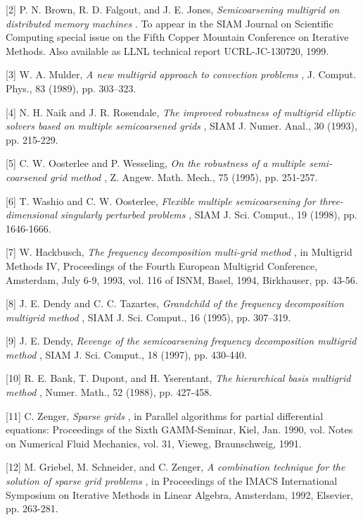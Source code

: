 \documentclass[11pt]{article}
\begin{document}
[2] P. N. Brown, R. D. Falgout, and J. E. Jones,
{\em 
Semicoarsening
multigrid on distributed memory machines
}
.  To appear in the SIAM
Journal on Scientific Computing special issue on the Fifth Copper
Mountain Conference on Iterative Methods. Also available as LLNL
technical report UCRL-JC-130720, 1999.

[3] W. A. Mulder,
{\em 
A new multigrid approach to convection
problems
}
, J.  Comput. Phys., 83 (1989), pp. 303--323.

[4] N. H. Naik and J. R. Rosendale,
{\em 
The improved robustness of
multigrid elliptic solvers based on multiple semicoarsened grids
}
,
SIAM J. Numer.  Anal., 30 (1993), pp. 215-229.

[5] C. W. Oosterlee and P. Wesseling,
{\em 
On the robustness of a multiple
semi-coarsened grid method
}
, Z. Angew. Math. Mech., 75 (1995),
pp. 251-257.

[6] T. Washio and C. W. Oosterlee,
{\em 
Flexible multiple semicoarsening for
three-dimensional singularly perturbed problems
}
, SIAM
J. Sci. Comput., 19 (1998), pp. 1646-1666.

[7] W. Hackbusch,
{\em 
The frequency decomposition multi-grid method
}
,
in Multigrid Methods IV, Proceedings of the Fourth European Multigrid
Conference, Amsterdam, July 6-9, 1993, vol. 116 of ISNM, Basel, 1994,
Birkhauser, pp. 43-56.

[8] J. E. Dendy and C. C. Tazartes,
{\em 
Grandchild of the frequency
decomposition multigrid method
}
, SIAM J. Sci. Comput., 16 (1995),
pp. 307--319.

[9] J. E. Dendy,
{\em 
Revenge of the semicoarsening frequency
decomposition multigrid method
}
, SIAM J. Sci. Comput., 18 (1997),
pp. 430-440.

[10] R. E. Bank, T. Dupont, and H. Yserentant,
{\em 
The hierarchical basis
multigrid method
}
, Numer. Math., 52 (1988), pp. 427-458.

[11] C. Zenger,
{\em 
Sparse grids
}
, in Parallel algorithms for partial
differential equations: Proceedings of the Sixth GAMM-Seminar, Kiel,
Jan.  1990, vol. Notes on Numerical Fluid Mechanics, vol. 31, Vieweg,
Braunschweig, 1991.

[12] M. Griebel, M. Schneider, and C. Zenger,
{\em 
A combination technique
for the solution of sparse grid problems
}
, in Proceedings of the
IMACS International Symposium on Iterative Methods in Linear Algebra,
Amsterdam, 1992, Elsevier, pp. 263-281.
\end{document}
